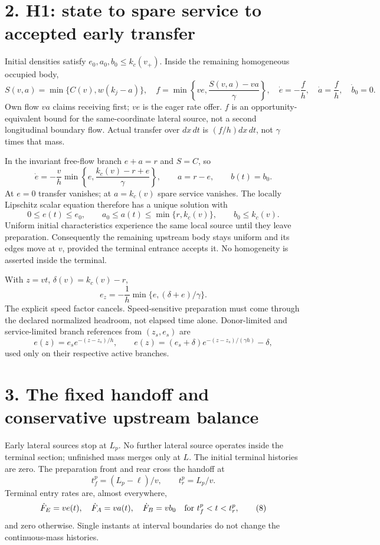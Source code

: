 \documentclass[11pt,a4paper]{article}
\begin{document}
\section*{2. H1: state to spare service to accepted early transfer}
Initial densities satisfy $e_0,a_0,b_0\leq k_c(v_+)$.
Inside the remaining homogeneous occupied body,
\[
 S(v,a)=\min\{C(v),w(k_j-a)\},\quad
 f=\min\left\{ve,\frac{S(v,a)-va}{\gamma}\right\},\quad
 \dot e=-\frac f h,\quad \dot a=\frac f h,\quad \dot b_0=0.
 \tag{3}
\]
Own flow $va$ claims receiving first; $ve$ is the eager rate offer.
$f$ is an opportunity-equivalent bound for the same-coordinate lateral
source, not a second longitudinal boundary flow. Actual transfer over
$dx\,dt$ is $(f/h)dx\,dt$, not $\gamma$ times that mass.

In the invariant free-flow branch $e+a=r$ and $S=C$, so
\[
 \dot e=-\frac v h\min\left\{e,\frac{k_c(v)-r+e}{\gamma}\right\},
 \qquad a=r-e,\qquad b(t)=b_0.
 \tag{4}
\]
At $e=0$ transfer vanishes; at $a=k_c(v)$ spare service vanishes.
The locally Lipschitz scalar equation therefore has a unique solution with
\[
 0\leq e(t)\leq e_0,\qquad
 a_0\leq a(t)\leq\min\{r,k_c(v)\},\qquad b_0\leq k_c(v).
 \tag{5}
\]
Uniform initial characteristics experience the same local source until they
leave preparation. Consequently the remaining upstream body stays uniform
and its edges move at $v$, provided the terminal entrance accepts it.
No homogeneity is asserted inside the terminal.

With $z=vt$, $\delta(v)=k_c(v)-r$,
\[
 e_z=-\frac1h\min\{e,(\delta+e)/\gamma\}.
 \tag{6}
\]
The explicit speed factor cancels. Speed-sensitive preparation must come
through the declared normalized headroom, not elapsed time alone.
Donor-limited and service-limited branch references from $(z_s,e_s)$ are
\[
 e(z)=e_s e^{-(z-z_s)/h},\qquad
 e(z)=(e_s+\delta)e^{-(z-z_s)/(\gamma h)}-\delta,
 \tag{7}
\]
used only on their respective active branches.

\section*{3. The fixed handoff and conservative upstream balance}
Early lateral sources stop at $L_p$. No further lateral source operates
inside the terminal section; unfinished mass merges only at $L$.
The initial terminal histories are zero.
The preparation front and rear cross the handoff at
\[
 t_f^p=(L_p-\ell)/v,\qquad t_r^p=L_p/v.
\]
Terminal entry rates are, almost everywhere,
\[
 \dot F_E=ve(t),\quad \dot F_A=va(t),\quad \dot F_B=vb_0
 \quad\hbox{for }t_f^p<t<t_r^p,
 \tag{8}
\]
and zero otherwise. Single instants at interval boundaries do not change
the continuous-mass histories.
\end{document}
